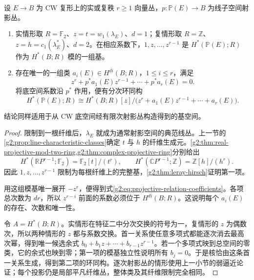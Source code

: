 \begin{theorem}[射影丛公式]\label{g2:thm:projective-bundle}
	设 \(E\to B\) 为 CW 复形上的实或复秩 \(r\ge1\) 向量丛，\(p:\mathbb P(E)\to B\) 为线子空间射影丛。
	\begin{enumerate}
		\item 实情形取 \(R=\mathbb F_2\)、\(z=t=w_1(\lambda_E)\)、\(d=1\)；复情形取 \(R=\mathbb Z\)、\(z=h=c_1(\lambda_E^*)\)、\(d=2\)。在相应系数下，\(1,z,\ldots,z^{r-1}\) 是 \(H^*(\mathbb P(E);R)\) 作为 \(H^*(B;R)\) 模的一组基。
		\item 存在唯一的一组类 \(a_i(E)\in H^{di}(B;R)\)，\(1\le i\le r\)，满足
		\begin{equation}\label{g2:eq:projective-relation-coefficients}
			z^r+p^*a_1(E)z^{r-1}+\cdots+p^*a_r(E)=0.
		\end{equation}
		将底空间系数沿 \(p^*\) 作用，便有分次环同构
		\begin{equation}\label{g2:eq:projective-ring-presentation}
			H^*(\mathbb P(E);R)\cong H^*(B;R)[z]\big/\bigl(z^r+a_1(E)z^{r-1}+\cdots+a_r(E)\bigr).
		\end{equation}
	\end{enumerate}
	结论同样适用于从 CW 底空间经有限次射影丛构造得到的基空间。
\end{theorem}
\begin{proof}
	限制到一根纤维后，\(\lambda_E\) 就成为通常射影空间的典范线丛。上一节的\cref{g2:prop:line-characteristic-classes}确定 \(t\) 与 \(h\) 的纤维生成元。\cref{g2:thm:real-projective-mod-two-ring,g2:thm:complex-projective-ring}分别给出
	\[
		H^*(\mathbb RP^{r-1};\mathbb F_2)=\mathbb F_2[t]/(t^r),\qquad
		H^*(\mathbb CP^{r-1};\mathbb Z)=\mathbb Z[h]/(h^r).
	\]
	因此 \(1,z,\ldots,z^{r-1}\) 限制为每根纤维上的完整基，\cref{g2:thm:leray-hirsch}证明第一项。

	用这组模基唯一展开 \(-z^r\)，便得到式\eqref{g2:eq:projective-relation-coefficients}。各项总次数为 \(dr\)，所以 \(z^{r-i}\) 前面的系数必须位于 \(H^{di}(B;R)\)。这说明每个 \(a_i(E)\) 的存在、次数和唯一性。

	令 \(A=H^*(B;R)\)。实情形在特征二中分次交换的符号为一，复情形的 \(z\) 为偶数次，所以两种情形的 \(z\) 都与系数交换。首一关系使任意多项式都能逐次消去最高次幂，得到唯一候选余式 \(b_0+b_1z+\cdots+b_{r-1}z^{r-1}\)。若一个多项式映到总空间的零类，它的余式也映到零；第一项的模基独立性说明所有 \(b_j=0\)。于是核恰由这条首一关系生成，得到第二项的环同构。逐次射影丛的情形使用上一小节的弱逼近论证；每个投影仍是局部平凡纤维丛，整体类及其纤维限制完全相同。
\end{proof}

